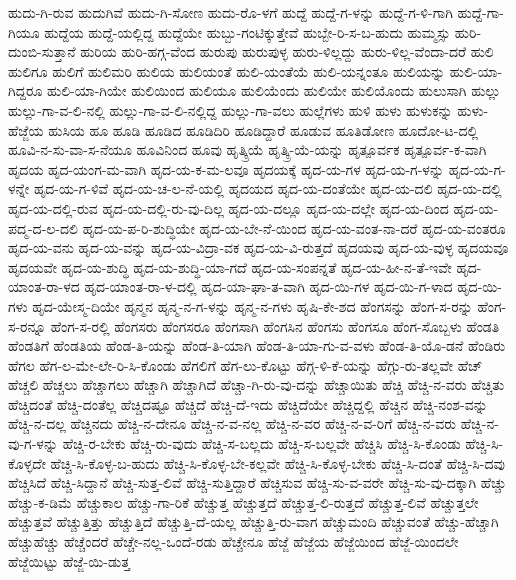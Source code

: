 {ಹುದು-ಗಿ-ರುವ
ಹುದುಗಿವೆ
ಹುದು-ಗಿ-ಸೋಣ
ಹುದು-ರೊ-ಳಗೆ
ಹುದ್ದೆ
ಹುದ್ದೆ-ಗ-ಳನ್ನು
ಹುದ್ದೆ-ಗ-ಳಿ-ಗಾಗಿ
ಹುದ್ದೆ-ಗಾ-ಗಿಯೂ
ಹುದ್ದೆಯ
ಹುದ್ದೆ-ಯಲ್ಲಿದ್ದ
ಹುದ್ದೆಯೇ
ಹುಬ್ಬು-ಗಂಟಿಕ್ಕುತ್ತೇವೆ
ಹುಬ್ಬೇ-ರಿ-ಸ-ಬ-ಹುದು
ಹುಮ್ಮಸ್ಸು
ಹುರಿ-ದುಂಬಿ-ಸುತ್ತಾನೆ
ಹುರಿಯ
ಹುರಿ-ಹಗ್ಗ-ವೆಂದ
ಹುರುಪು
ಹುರುಪುಳ್ಳ
ಹುರು-ಳಿಲ್ಲದ್ದು
ಹುರು-ಳಿಲ್ಲ-ವೆಂದಾ-ದರೆ
ಹುಲಿ
ಹುಲಿಗೂ
ಹುಲಿಗೆ
ಹುಲಿಮರಿ
ಹುಲಿಯ
ಹುಲಿಯಂತೆ
ಹುಲಿ-ಯಂತೆಯೆ
ಹುಲಿ-ಯನ್ನಂತೂ
ಹುಲಿಯನ್ನು
ಹುಲಿ-ಯಾ-ಗಿದ್ದರೂ
ಹುಲಿ-ಯಾ-ಗಿಯೇ
ಹುಲಿಯಿಂದ
ಹುಲಿಯೂ
ಹುಲಿಯೆಂದು
ಹುಲಿಯೇ
ಹುಲಿಯೊಂದು
ಹುಲುಸಾಗಿ
ಹುಲ್ಲು
ಹುಲ್ಲು-ಗಾ-ವ-ಲಿ-ನಲ್ಲಿ
ಹುಲ್ಲು-ಗಾ-ವ-ಲಿ-ನಲ್ಲಿದ್ದ
ಹುಲ್ಲು-ಗಾ-ವಲು
ಹುಲ್ಲೆಗಳು
ಹುಳಿ
ಹುಳು
ಹುಳುಕನ್ನು
ಹುಳು-ಹೆಜ್ಜೆಯ
ಹುಸಿಯ
ಹೂ
ಹೂಡಿ
ಹೂಡಿದ
ಹೂಡಿದಿರಿ
ಹೂಡಿದ್ದಾರೆ
ಹೂಡುವ
ಹೂತಿಡೋಣ
ಹೂದೋ-ಟ-ದಲ್ಲಿ
ಹೂವಿ-ನ-ಸು-ವಾ-ಸ-ನೆಯೂ
ಹೂವಿನಿಂದ
ಹೂವು
ಹೃತ್ಕ್ರಿಯೆ
ಹೃತ್ಕ್ರಿ-ಯೆ-ಯನ್ನು
ಹೃತ್ಪೂರ್ವಕ
ಹೃತ್ಪೂರ್ವ-ಕ-ವಾಗಿ
ಹೃದಯ
ಹೃದ-ಯಂಗ-ಮ-ವಾಗಿ
ಹೃದ-ಯ-ಕ-ಮ-ಲವೂ
ಹೃದಯಕ್ಕೆ
ಹೃದ-ಯ-ಗಳ
ಹೃದ-ಯ-ಗ-ಳನ್ನು
ಹೃದ-ಯ-ಗ-ಳನ್ನೇ
ಹೃದ-ಯ-ಗ-ಳಿವೆ
ಹೃದ-ಯ-ಚ-ಲ-ನೆ-ಯಲ್ಲಿ
ಹೃದಯದ
ಹೃದ-ಯ-ದಂತೆಯೇ
ಹೃದ-ಯ-ದಲಿ
ಹೃದ-ಯ-ದಲ್ಲಿ
ಹೃದ-ಯ-ದಲ್ಲಿ-ರುವ
ಹೃದ-ಯ-ದಲ್ಲಿ-ರು-ವು-ದಿಲ್ಲ
ಹೃದ-ಯ-ದಲ್ಲೂ
ಹೃದ-ಯ-ದಲ್ಲೇ
ಹೃದ-ಯ-ದಿಂದ
ಹೃದ-ಯ-ಪದ್ಮ-ದ-ಲ-ದಲಿ
ಹೃದ-ಯ-ಪ-ರಿ-ಶುದ್ಧಿಯೇ
ಹೃದ-ಯ-ಬೇ-ನೆ-ಯಿಂದ
ಹೃದ-ಯ-ವಂತ-ನಾ-ದರೆ
ಹೃದ-ಯ-ವಂತರೂ
ಹೃದ-ಯ-ವನು
ಹೃದ-ಯ-ವನ್ನು
ಹೃದ-ಯ-ವಿದ್ರಾ-ವಕ
ಹೃದ-ಯ-ವಿ-ರುತ್ತದೆ
ಹೃದಯವು
ಹೃದ-ಯ-ವುಳ್ಳ
ಹೃದಯವೂ
ಹೃದಯವೇ
ಹೃದ-ಯ-ಶುದ್ಧಿ
ಹೃದ-ಯ-ಶುದ್ಧಿ-ಯಾ-ಗದೆ
ಹೃದ-ಯ-ಸಂಪನ್ನತೆ
ಹೃದ-ಯ-ಹೀ-ನ-ತೆ-ಇವೇ
ಹೃದ-ಯಾಂತ-ರಾ-ಳದ
ಹೃದ-ಯಾಂತ-ರಾ-ಳ-ದಲ್ಲಿ
ಹೃದ-ಯಾ-ಘಾ-ತ-ವಾಗಿ
ಹೃದ-ಯಿ-ಗಳ
ಹೃದ-ಯಿ-ಗ-ಳಾದ
ಹೃದ-ಯಿ-ಗಳು
ಹೃದ-ಯೇಸ್ಮ-ದಿಯೇ
ಹೃನ್ಮನ
ಹೃನ್ಮ-ನ-ಗ-ಳನ್ನು
ಹೃನ್ಮ-ನ-ಗಳು
ಹೃಷಿ-ಕೇ-ಶದ
ಹೆಂಗಸನ್ನು
ಹೆಂಗ-ಸ-ರನ್ನು
ಹೆಂಗ-ಸ-ರನ್ನೂ
ಹೆಂಗ-ಸ-ರಲ್ಲಿ
ಹೆಂಗಸರು
ಹೆಂಗಸರೂ
ಹೆಂಗಸಾಗಿ
ಹೆಂಗಸಿನ
ಹೆಂಗಸು
ಹೆಂಗಸೂ
ಹೆಂಗ-ಸೊಬ್ಬಳು
ಹೆಂಡತಿ
ಹೆಂಡತಿಗೆ
ಹೆಂಡತಿಯ
ಹೆಂಡ-ತಿ-ಯನ್ನು
ಹೆಂಡ-ತಿ-ಯಾಗಿ
ಹೆಂಡ-ತಿ-ಯಾ-ಗು-ವ-ವಳು
ಹೆಂಡ-ತಿ-ಯೊ-ಡನೆ
ಹೆಂಡಿರು
ಹೆಗಲ
ಹೆಗ-ಲ-ಮೇ-ಲೇ-ರಿ-ಸಿ-ಕೊಂಡು
ಹೆಗಲಿಗೆ
ಹೆಗ-ಲು-ಕೊಟ್ಟು
ಹೆಗ್ಗ-ಳಿ-ಕೆ-ಯನ್ನು
ಹೆಗ್ಗು-ರು-ತಲ್ಲವೇ
ಹೆಚ್
ಹೆಚ್ಚಲಿ
ಹೆಚ್ಚಲು
ಹೆಚ್ಚಾಗಲು
ಹೆಚ್ಚಾಗಿ
ಹೆಚ್ಚಾಗಿದೆ
ಹೆಚ್ಚಾ-ಗಿ-ರು-ವು-ದನ್ನು
ಹೆಚ್ಚಾಯಿತು
ಹೆಚ್ಚಿ
ಹೆಚ್ಚಿ-ನ-ವರು
ಹೆಚ್ಚಿತು
ಹೆಚ್ಚಿದಂತೆ
ಹೆಚ್ಚಿ-ದಂತೆಲ್ಲ
ಹೆಚ್ಚಿದಷ್ಟೂ
ಹೆಚ್ಚಿದೆ
ಹೆಚ್ಚಿ-ದೆ-ಇದು
ಹೆಚ್ಚಿದೆಯೇ
ಹೆಚ್ಚಿದ್ದಲ್ಲಿ
ಹೆಚ್ಚಿನ
ಹೆಚ್ಚಿ-ನಂಶ-ವನ್ನು
ಹೆಚ್ಚಿ-ನ-ದಲ್ಲ
ಹೆಚ್ಚಿನದು
ಹೆಚ್ಚಿ-ನ-ದೇನೂ
ಹೆಚ್ಚಿ-ನ-ವ-ನಲ್ಲ
ಹೆಚ್ಚಿ-ನ-ವರ
ಹೆಚ್ಚಿ-ನ-ವ-ರಿಗೆ
ಹೆಚ್ಚಿ-ನ-ವರು
ಹೆಚ್ಚಿ-ನ-ವು-ಗ-ಳನ್ನು
ಹೆಚ್ಚಿ-ರ-ಬೇಕು
ಹೆಚ್ಚಿ-ರು-ವುದು
ಹೆಚ್ಚಿ-ಸ-ಬಲ್ಲದು
ಹೆಚ್ಚಿ-ಸ-ಬಲ್ಲವೇ
ಹೆಚ್ಚಿಸಿ
ಹೆಚ್ಚಿ-ಸಿ-ಕೊಂಡು
ಹೆಚ್ಚಿ-ಸಿ-ಕೊಳ್ಳದೇ
ಹೆಚ್ಚಿ-ಸಿ-ಕೊಳ್ಳ-ಬ-ಹುದು
ಹೆಚ್ಚಿ-ಸಿ-ಕೊಳ್ಳ-ಬೇ-ಕಲ್ಲವೇ
ಹೆಚ್ಚಿ-ಸಿ-ಕೊಳ್ಳ-ಬೇಕು
ಹೆಚ್ಚಿ-ಸಿ-ದಂತೆ
ಹೆಚ್ಚಿ-ಸಿ-ದವು
ಹೆಚ್ಚಿಸಿದೆ
ಹೆಚ್ಚಿ-ಸಿದ್ದಾನೆ
ಹೆಚ್ಚಿ-ಸುತ್ತ-ಲಿವೆ
ಹೆಚ್ಚಿ-ಸುತ್ತಿದ್ದಾರೆ
ಹೆಚ್ಚಿಸುವ
ಹೆಚ್ಚಿ-ಸು-ವ-ವರೇ
ಹೆಚ್ಚಿ-ಸು-ವು-ದಕ್ಕಾಗಿ
ಹೆಚ್ಚು
ಹೆಚ್ಚು-ಕ-ಡಿಮೆ
ಹೆಚ್ಚುಕಾಲ
ಹೆಚ್ಚು-ಗಾ-ರಿಕೆ
ಹೆಚ್ಚುತ್ತ
ಹೆಚ್ಚುತ್ತದೆ
ಹೆಚ್ಚುತ್ತ-ಲಿ-ರುತ್ತದೆ
ಹೆಚ್ಚುತ್ತ-ಲಿವೆ
ಹೆಚ್ಚುತ್ತಲೇ
ಹೆಚ್ಚುತ್ತವೆ
ಹೆಚ್ಚುತ್ತಿತ್ತು
ಹೆಚ್ಚುತ್ತಿದೆ
ಹೆಚ್ಚುತ್ತಿ-ದೆ-ಯಲ್ಲ
ಹೆಚ್ಚುತ್ತಿ-ರು-ವಾಗ
ಹೆಚ್ಚುಮಂದಿ
ಹೆಚ್ಚುವಂತೆ
ಹೆಚ್ಚು-ಹೆಚ್ಚಾಗಿ
ಹೆಚ್ಚುಹೆಚ್ಚು
ಹೆಚ್ಚೆಂದರೆ
ಹೆಚ್ಚೇ-ನಲ್ಲ-ಒಂದೆ-ರಡು
ಹೆಚ್ಚೇನೂ
ಹೆಜ್ಜೆ
ಹೆಜ್ಜೆಯ
ಹೆಜ್ಜೆಯಿಂದ
ಹೆಜ್ಜೆ-ಯಿಂದಲೇ
ಹೆಜ್ಜೆಯಿಟ್ಟು
ಹೆಜ್ಜೆ-ಯಿ-ಡುತ್ತ
}
